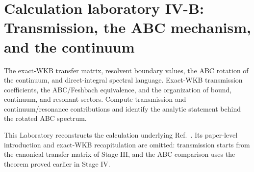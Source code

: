 \section{Calculation laboratory IV-B: Transmission, the ABC mechanism, and the continuum}
\label{lab:2508_09211}

\calculationroute
  {The exact-WKB transfer matrix, resolvent boundary values, the ABC rotation of the continuum, and direct-integral spectral language.}
  {Exact-WKB transmission coefficients, the ABC/Feshbach equivalence, and the organization of bound, continuum, and resonant sectors.}
  {Compute transmission and continuum/resonance contributions and identify the analytic statement behind the rotated ABC spectrum.}

This Laboratory reconstructs the calculation underlying
Ref.~\cite{Morikawa:2025vvs}.  Its paper-level introduction and exact-WKB
recapitulation are omitted: transmission starts from the canonical transfer
matrix of Stage III, and the ABC comparison uses the theorem proved earlier
in Stage IV.


